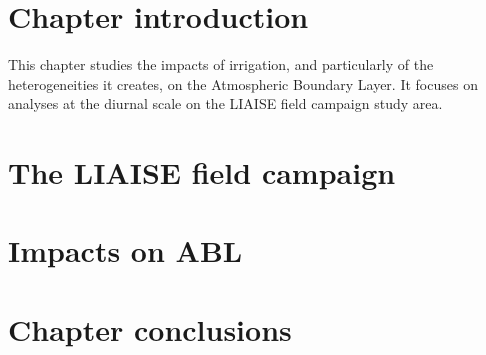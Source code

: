 \section{Chapter introduction}
This chapter studies the impacts of irrigation, and particularly of the heterogeneities it creates, on the Atmospheric Boundary Layer. It focuses on analyses at the diurnal scale on the LIAISE field campaign study area.

\section{The LIAISE field campaign}

\section{Impacts on ABL}

\section{Chapter conclusions}